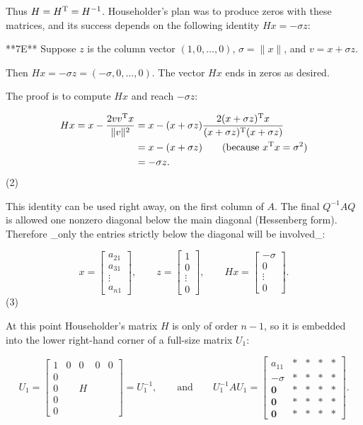 Thus \(H=H^{\rm T}=H^{-1}\). Householder's plan was to produce zeros with these matrices, and its success depends on the following identity \(Hx=-\sigma z\):

**7E** Suppose \(z\) is the column vector \((1,0,\ldots,0)\), \(\sigma=\|x\|\), and \(v=x+\sigma z\).

Then \(Hx=-\sigma z=(-\sigma,0,\ldots,0)\). The vector \(Hx\) ends in zeros as desired.

The proof is to compute \(Hx\) and reach \(-\sigma z\):

\[\begin{split} Hx=x-\frac{2vv^{\rm T}x}{\|v\|^{2}}& =x-(x+\sigma z)\frac{2(x+\sigma z)^{\rm T}x}{(x+\sigma z)^{\rm T}( x+\sigma z)}\\ &=x-(x+\sigma z)\qquad\text{(because $x^{\rm T}x=\sigma^{2}$)}\\ &=-\sigma z.\end{split}\] (2)

This identity can be used right away, on the first column of \(A\). The final \(Q^{-1}AQ\) is allowed one nonzero diagonal below the main diagonal (Hessenberg form). Therefore _only the entries strictly below the diagonal will be involved_:

\[x=\begin{bmatrix}a_{21}\\ a_{31}\\ \vdots\\ a_{n1}\end{bmatrix},\qquad z=\begin{bmatrix}1\\ 0\\ \vdots\\ 0\end{bmatrix},\qquad Hx=\begin{bmatrix}-\sigma\\ 0\\ \vdots\\ 0\end{bmatrix}.\] (3)

At this point Householder's matrix \(H\) is only of order \(n-1\), so it is embedded into the lower right-hand corner of a full-size matrix \(U_{1}\):

\[U_{1}=\begin{bmatrix}1&0&0&0&0\\ 0&&&&\\ 0&&H&&\\ 0&&&&\\ 0&&&&\end{bmatrix}=U_{1}^{-1},\qquad\text{and}\qquad U_{1}^{-1}AU_{1}=\begin{bmatrix}a _{11}&*&*&*&*\\ -\sigma&*&*&*&*\\ \mathbf{0}&*&*&*&*\\ \mathbf{0}&*&*&*&*\\ \mathbf{0}&*&*&*&*\end{bmatrix}.\]

